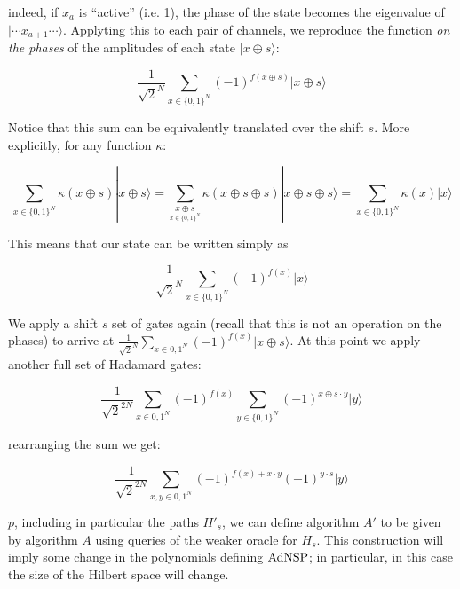 \documentclass[letterpaper,onecolumn]{quantumarticle}
\newcommand{\Ocl}{{\rm AdNSP}}
\begin{document}
\noindent indeed, if $x_a$ is ``active'' (i.e. 1), the phase of the state becomes the eigenvalue of $| \cdots x_{a+1} \cdots \rangle$. Applyting this to each pair of channels, we reproduce the function \emph{on the phases} of the amplitudes of each state $|x \oplus s \rangle$:

$$\frac{1}{\sqrt{2}^N} \sum_{x\in \{0,1\}^N} (-1)^{f(x\oplus s)}|x \oplus s\rangle$$

\noindent Notice that this sum can be equivalently translated over the shift $s$. More explicitly, for any function $\kappa$:

$$\sum_{x\in \{0,1\}^N} \kappa(x\oplus s) |x \oplus s\rangle  =\sum_{\underset{x\in \{0,1\}^N}{x\oplus s}} \kappa(x\oplus s \oplus s) |x \oplus s \oplus s\rangle= \sum_{x\in \{0,1\}^N} \kappa(x)|x \rangle$$

This means that our state can be written simply as 

$$\frac{1}{\sqrt{2}^N} \sum_{x\in \{0,1\}^N} (-1)^{f(x)}|x \rangle$$

 We apply a shift $s$ set of gates again (recall that this is not an operation on the phases) to arrive at $\frac{1}{\sqrt{2}^N} \sum_{x\in {0,1}^N} (-1)^{f(x)}|x \oplus s\rangle$. At this point we apply another full set of Hadamard gates:
 
$$\frac{1}{\sqrt{2}^{2N}} \sum_{x\in {0,1}^N} (-1)^{f(x)} \sum_{y \in \{ 0,1 \}^N} (-1)^{x\oplus s\cdot y}|y \rangle $$
 
rearranging the sum we get:

$$\frac{1}{\sqrt{2}^{2N}} \sum_{x,y\in {0,1}^N}   (-1)^{f(x )+x\cdot y}(-1)^{y\cdot s}|y \rangle $$


$p$, including in particular the paths $H'_s$,
we can define algorithm $A'$ to be given by algorithm $A$ using queries of the weaker oracle for $H_s$.
This construction will imply some change in the polynomials defining $\Ocl$; in particular, in this case the size of the Hilbert space will change.
\end{document}

